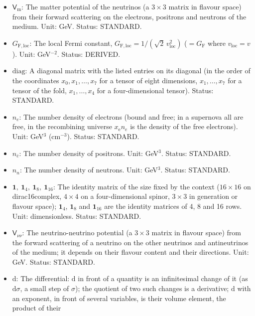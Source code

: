 \documentclass[
  10pt,
]{article}
\providecommand{\tightlist}{%
  \setlength{\itemsep}{0pt}\setlength{\parskip}{0pt}}
\begin{document}
\begin{itemize}
\tightlist
\item
  \(\mathsf{V}_{\mathrm{m}}\): The matter potential of the neutrinos (a
  \(3 \times 3\) matrix in flavour space) from their forward scattering
  on the electrons, positrons and neutrons of the medium. Unit: GeV.
  Status: STANDARD.
\item
  \(G_{\mathrm{F,loc}}\): The local Fermi constant,
  \(G_{\mathrm{F,loc}} = 1/(\sqrt2\,v_{\mathrm{loc}}^2)\)
  (\(= G_{\mathrm{F}}\) where \(v_{\mathrm{loc}} = v\)). Unit:
  GeV\(^{-2}\). Status: DERIVED.
\item
  \(\mathrm{diag}\): A diagonal matrix with the listed entries on its
  diagonal (in the order of the coordinates \(x_0, x_1, \dots, x_7\) for
  a tensor of eight dimensions, \(x_1, \dots, x_7\) for a tensor of the
  fold, \(x_1, \dots, x_4\) for a four-dimensional tensor). Status:
  STANDARD.
\item
  \(n_e\): The number density of electrons (bound and free; in a
  supernova all are free, in the recombining universe
  \(x_{\mathrm{e}}n_e\) is the density of the free electrons). Unit:
  GeV\(^3\) (cm\(^{-3}\)). Status: STANDARD.
\item
  \(n_{\bar e}\): The number density of positrons. Unit: GeV\(^3\).
  Status: STANDARD.
\item
  \(n_n\): The number density of neutrons. Unit: GeV\(^3\). Status:
  STANDARD.
\item
  \(\mathbf{1},\ \mathbf{1}_4,\ \mathbf{1}_8,\ \mathbf{1}_{16}\): The
  identity matrix of the size fixed by the context (\(16 \times 16\) on
  dirac16complex, \(4 \times 4\) on a four-dimensional spinor,
  \(3 \times 3\) in generation or flavour space); \(\mathbf{1}_4\),
  \(\mathbf{1}_8\) and \(\mathbf{1}_{16}\) are the identity matrices of
  4, 8 and 16 rows. Unit: dimensionless. Status: STANDARD.
\item
  \(\mathsf{V}_{\nu\nu}\): The neutrino-neutrino potential (a
  \(3 \times 3\) matrix in flavour space) from the forward scattering of
  a neutrino on the other neutrinos and antineutrinos of the medium; it
  depends on their flavour content and their directions. Unit: GeV.
  Status: STANDARD.
\item
  \(\mathrm{d}\): The differential: \(\mathrm{d}\) in front of a
  quantity is an infinitesimal change of it (as \(\mathrm{d}\sigma\), a
  small step of \(\sigma\)); the quotient of two such changes is a
  derivative; \(\mathrm{d}\) with an exponent, in front of several
  variables, is their volume element, the product of their

\end{itemize}
\end{document}
